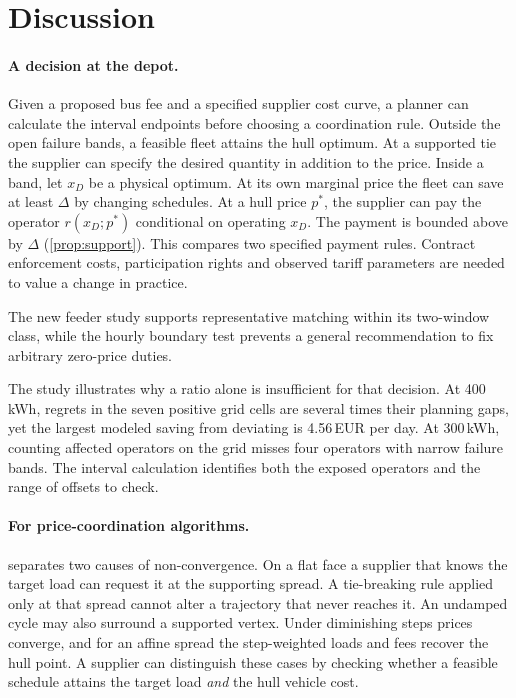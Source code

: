 \documentclass[11pt]{article}
\theoremstyle{definition}\newtheorem{definition}[theorem]{Definition}
\theoremstyle{remark}\newtheorem{remark}[theorem]{Remark}
\begin{document}
\section{Discussion}\label{sec:discussion}

\paragraph{A decision at the depot.} Given a proposed bus fee and a specified
supplier cost curve, a planner can calculate the interval endpoints before
choosing a coordination rule. Outside the open failure bands, a feasible
fleet attains the hull optimum. At a supported tie the supplier can specify
the desired quantity in addition to the price. Inside a band, let $x_D$ be a
physical optimum. At its own marginal price the fleet can save at least
$\Delta$ by changing schedules. At a hull price $p^*$, the supplier can pay
the operator $r(x_D;p^*)$ conditional on operating $x_D$. The payment
is bounded above by $\Delta$ (\cref{prop:support}). This compares two
specified payment rules. Contract enforcement costs, participation rights
and observed tariff parameters are needed to value a change in practice.

The new feeder study supports representative matching within its two-window
class, while the hourly boundary test prevents a general recommendation to
fix arbitrary zero-price duties.

The study illustrates why a ratio alone is insufficient for that decision.
At 400\,kWh, regrets in the seven positive grid cells are several times
their planning gaps, yet the largest modeled saving from deviating is
4.56\,EUR per day. At 300\,kWh, counting affected operators on the grid
misses four operators with narrow failure bands. The interval calculation
identifies both the exposed operators and the range of offsets to check.

\paragraph{For price-coordination algorithms.}  separates
two causes of non-convergence. On a flat face a supplier that knows the
target load can request it at the supporting spread. A tie-breaking rule
applied only at that spread cannot alter a trajectory that never reaches
it. An undamped cycle may also surround a supported vertex. Under diminishing
steps prices converge, and for an affine spread the step-weighted loads and
fees recover the hull point. A supplier can distinguish these cases by
checking whether a feasible schedule attains the target load \emph{and}
the hull vehicle cost.
\end{document}
